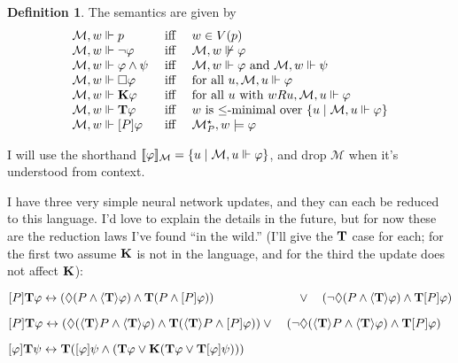 \documentclass[letterpaper]{article}
\theoremstyle{definition}
\newtheorem{definition}{Definition}
\newcommand{\semantics}[1]{[\![\mbox{\em $ #1 $\/}]\!]}
\newcommand{\Model}{\mathcal{M}}
\newcommand{\set}[1]{\{ #1 \}}
\newcommand{\Typ}[1]{\textrm{\textup{\textbf{T}}} #1}
\newcommand{\Know}[1]{\textrm{\textup{\textbf{K}}} #1}
\newcommand{\KnowNoArgs}{\textrm{\textup{\textbf{K}}}}
\newcommand{\Hebbop}[1]{[#1]}
\newcommand{\Update}[1]{[#1]}
\newcommand{\diaTyp}[1]{\langle \textrm{\textup{\textbf{T}}} \rangle #1}
\begin{document}
\begin{definition}
    The semantics are given by
    \[
    \begin{array}{lcl}
        \Model, w \Vdash p & \mbox{ iff } & w \in V(p)\\
        \Model, w \Vdash \neg \varphi & \mbox{ iff } & \Model, w \not \Vdash \varphi\\
        \Model, w \Vdash \varphi \land \psi & \mbox{ iff } & \Model, w \Vdash \varphi \mbox{ and } \Model, w \Vdash \psi\\
        \Model, w \Vdash \Box \varphi & \mbox{ iff } & \mbox{for all } u, \Model, u \Vdash \varphi\\
        \Model, w \Vdash \Know \varphi & \mbox{ iff } & \mbox{for all } u \mbox{ with } w{R}u, \Model, u \Vdash \varphi \\
        \Model, w \Vdash \Typ{\varphi} & \mbox{ iff } & w \mbox{ is } {\leq}\mbox{-minimal over } \set{u \mid \Model, u \Vdash \varphi} \\
        \Model, w \Vdash \Update{P} \varphi & \mbox{ iff } & \Model^\star_P, w \models \varphi
    \end{array}
    \]
\end{definition}

I will use the shorthand $\semantics{\varphi}_\Model =   \set{u \mid \Model, u \Vdash \varphi}$, and drop $\Model$ when it's understood from context.

I have three very simple neural network updates, and they can each be reduced to this language.  I'd love to explain the details in the future, but for now these are the reduction laws I've found ``in the wild.'' (I'll give the $\Typ$ case for each; for the first two assume $\KnowNoArgs$ is not in the language, and for the third the update does not affect $\KnowNoArgs$):
\begin{description}[leftmargin=1.25in]
    \item[Axiom A.] $\Update{P} \Typ{\varphi} \leftrightarrow 
    (\Diamond(P \land \diaTyp{\varphi}) \land \Typ{(P \land \Update{P} \varphi)}) \\
    \quad\quad\quad\quad\quad\quad\quad \lor \quad (\neg \Diamond(P \land \diaTyp{\varphi}) \land \Typ{\Update{P} \varphi})$
    \item[Axiom B.] $\Update{P} \Typ{\varphi} \leftrightarrow 
    (\Diamond(\diaTyp{P} \land \diaTyp{\varphi}) \land \Typ{(\diaTyp{P} \land \Update{P} \varphi)}) \\
    \lor \quad (\neg \Diamond(\diaTyp{P} \land \diaTyp{\varphi}) \land \Typ{\Update{P} \varphi})$
    \item[Axiom C.] $\Hebbop{\varphi} \Typ{\psi} \leftrightarrow 
    \Typ{(\Hebbop{\varphi}\psi \land (\Typ{\varphi \lor \Know{(\Typ{\varphi} \lor \Typ{\Hebbop{\varphi}\psi})}}))}$
\end{description}
\end{document}
